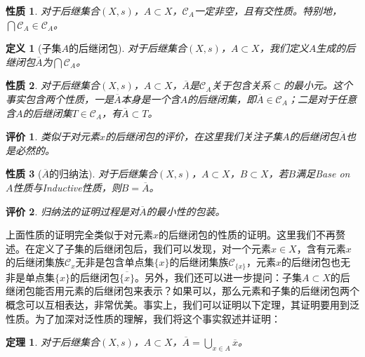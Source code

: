 \documentclass[oneside, 12pt]{ctexart}
\newtheorem{definition}{定义}[section]
\newtheorem{property}{性质}[section]
\newtheorem{theorem}{定理}[section]
\newtheorem{remark}{评价}[section]
\begin{document}
\begin{property}
	对于后继集合$(X, s)$，$A \subset X$，$\mathcal{C}_A$一定非空，且有交性质。特别地，$\bigcap\mathcal{C}_A \in \mathcal{C}_A$。
\end{property}

\begin{definition}[子集$A$的后继闭包]
	对于后继集合$(X, s)$，$A \subset X$，我们定义$A$生成的后继闭包$\overline{A}$为$\bigcap\mathcal{C}_A$。
\end{definition}

\begin{property}
	对于后继集合$(X, s)$，$A \subset X$，$\overline{A}$是$\mathcal{C}_A$关于包含关系$\subset$的最小元。这个事实包含两个性质，一是$\overline{A}$本身是一个含$A$的后继闭集，即$\overline{A} \in \mathcal{C}_A$；二是对于任意含$A$的后继闭集$T \in \mathcal{C}_A$，有$\overline{A} \subset T$。
\end{property}

\begin{remark}
	类似于对元素$x$的后继闭包的评价，在这里我们关注子集$A$的后继闭包$\overline{A}$也是必然的。
\end{remark}

\begin{property}[$\overline{A}$的归纳法]
	对于后继集合$(X, s)$，$A \subset X$，$B \subset X$，若$B$满足Base on $A$性质与Inductive性质，则$B = \overline{A}$。
\end{property}

\begin{remark}
	归纳法的证明过程是对$\overline{A}$的最小性的包装。
\end{remark}

上面性质的证明完全类似于对元素$x$的后继闭包的性质的证明。这里我们不再赘述。在定义了子集的后继闭包后，我们可以发现，对一个元素$x \in X$，含有元素$x$的后继闭集族$\mathcal{C}_x$无非是包含单点集$\{x\}$的后继闭集族$\mathcal{C}_{\{x\}}$，元素$x$的后继闭包也无非是单点集$\{x\}$的后继闭包$\overline{\{x\}}$。另外，我们还可以进一步提问：子集$A \subset X$的后继闭包能否用元素的后继闭包来表示？如果可以，那么元素和子集的后继闭包两个概念可以互相表达，非常优美。事实上，我们可以证明以下定理，其证明要用到泛性质。为了加深对泛性质的理解，我们将这个事实叙述并证明：

\begin{theorem}
	对于后继集合$(X, s)$，$A \subset X$，$\overline{A} = \bigcup\limits_{x \in A}\overline{x}$。
\end{theorem}
\end{document}

